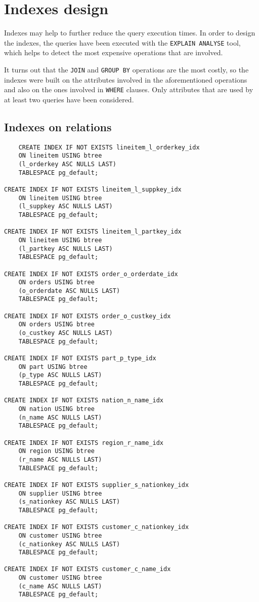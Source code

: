 

\section{Indexes design}

Indexes may help to further reduce the query execution times. In order to design the indexes, the queries have been executed with the \texttt{EXPLAIN ANALYSE} tool, which helps to detect the most expensive operations that are involved.

It turns out that the \texttt{JOIN} and \texttt{GROUP BY} operations are the most costly, so the indexes were built on the attributes involved in the aforementioned operations and also on the ones involved in \texttt{WHERE} clauses. Only attributes that are used by at least two queries have been considered.

\subsection{Indexes on relations}

\begin{lstlisting}
	CREATE INDEX IF NOT EXISTS lineitem_l_orderkey_idx
    ON lineitem USING btree
    (l_orderkey ASC NULLS LAST)
    TABLESPACE pg_default;

CREATE INDEX IF NOT EXISTS lineitem_l_suppkey_idx
    ON lineitem USING btree
    (l_suppkey ASC NULLS LAST)
    TABLESPACE pg_default;
	
CREATE INDEX IF NOT EXISTS lineitem_l_partkey_idx
    ON lineitem USING btree
    (l_partkey ASC NULLS LAST)
    TABLESPACE pg_default;

CREATE INDEX IF NOT EXISTS order_o_orderdate_idx
    ON orders USING btree
    (o_orderdate ASC NULLS LAST)
    TABLESPACE pg_default;

CREATE INDEX IF NOT EXISTS order_o_custkey_idx
    ON orders USING btree
    (o_custkey ASC NULLS LAST)
    TABLESPACE pg_default;

CREATE INDEX IF NOT EXISTS part_p_type_idx
	ON part USING btree
	(p_type ASC NULLS LAST)
	TABLESPACE pg_default;

CREATE INDEX IF NOT EXISTS nation_n_name_idx
	ON nation USING btree
	(n_name ASC NULLS LAST)
	TABLESPACE pg_default;

CREATE INDEX IF NOT EXISTS region_r_name_idx
	ON region USING btree
	(r_name ASC NULLS LAST)
	TABLESPACE pg_default;

CREATE INDEX IF NOT EXISTS supplier_s_nationkey_idx
	ON supplier USING btree
	(s_nationkey ASC NULLS LAST)
	TABLESPACE pg_default;

CREATE INDEX IF NOT EXISTS customer_c_nationkey_idx
	ON customer USING btree
	(c_nationkey ASC NULLS LAST)
	TABLESPACE pg_default;

CREATE INDEX IF NOT EXISTS customer_c_name_idx
	ON customer USING btree
	(c_name ASC NULLS LAST)
	TABLESPACE pg_default;
\end{lstlisting}

